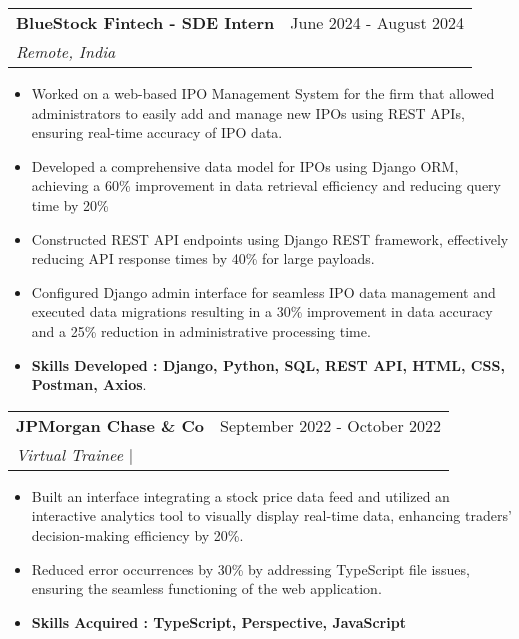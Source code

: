 \documentclass[letterpaper,11pt]{article}
\makeatletter
\newcommand{\resumeItem}[1]{
  \item\small{
    {#1 \vspace{-2pt}}
  }
}
\newcommand{\resumeSubheading}[4]{
  \vspace{-2pt}\item
    \begin{tabular*}{0.97\textwidth}[t]{l@{\extracolsep{\fill}}r}
      \textbf{#1} & #2 \\
      \textit{\small#3} & \textit{\small #4} \\
    \end{tabular*}\vspace{-7pt}
}
\newcommand{\resumeItemListStart}{\begin{itemize}}
\newcommand{\resumeItemListEnd}{\end{itemize}\vspace{-5pt}}
\makeatother
\begin{document}
  \resumeSubheading
    {BlueStock Fintech - SDE Intern}{June 2024 - August 2024}
    {Remote, India}{}
    \resumeItemListStart
         \vspace{0.1cm}
        \resumeItem{Worked on a web-based IPO Management System for the firm that allowed administrators to easily add and manage new IPOs using REST APIs, ensuring real-time accuracy of IPO data.}
        \vspace{0.1cm}
        \resumeItem{Developed a comprehensive data model for IPOs using Django ORM, achieving a 60\% improvement in data retrieval efficiency and reducing query time by 20\%}
        \vspace{0.1cm}
        \resumeItem{Constructed REST API endpoints using Django REST framework, effectively reducing API response times by 40\% for large payloads.}
        \vspace{0.1cm}
        \resumeItem{Configured Django admin interface for seamless IPO data management and executed data migrations resulting in a 30\% improvement in data accuracy and a 25\% reduction in administrative processing time.}
        \vspace{0.1cm}
        \resumeItem{\textbf{Skills Developed : Django, Python, SQL, REST API, HTML, CSS, Postman, Axios}.}
       \vspace{0.3cm}
    \resumeItemListEnd




    \resumeSubheading
    {JPMorgan Chase \& Co}{September 2022 - October 2022}
   {Virtual Trainee $|$ \href{https://bit.ly/4erIAH0}{\color{blue}{Certificate}}}{}
    \resumeItemListStart
        \vspace{0.1cm}
        \resumeItem{Built an interface integrating a stock price data feed and utilized an interactive analytics tool to visually display real-time data, enhancing traders' decision-making efficiency by 20\%.}
        \vspace{0.1cm}
        \resumeItem{Reduced error occurrences by 30\% by addressing TypeScript file issues, ensuring the seamless functioning of the web application.}
        \vspace{0.1cm}
       \resumeItem{\textbf{Skills Acquired : TypeScript, Perspective, JavaScript}}
    \resumeItemListEnd
\end{document}
